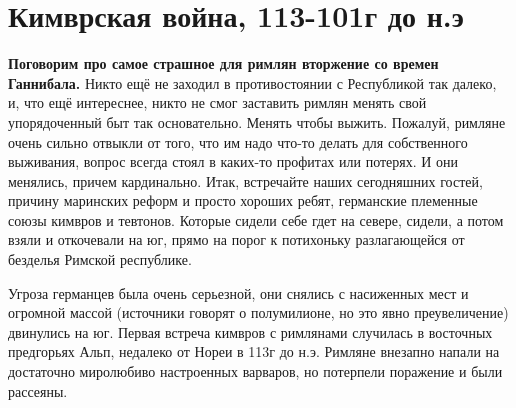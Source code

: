 \chapter{Кимврская война, 113-101г до н.э}



\textbf{Поговорим про самое страшное для римлян вторжение со времен Ганнибала.} Никто ещё не заходил в противостоянии с Республикой так далеко, и, что ещё интереснее, никто не смог заставить римлян менять свой упорядоченный быт так основательно. Менять чтобы выжить. Пожалуй, римляне очень сильно отвыкли от того, что им надо что-то делать для собственного выживания, вопрос всегда стоял в каких-то профитах или потерях. И они менялись, причем кардинально. Итак, встречайте наших сегодняшних гостей, причину маринских реформ и просто хороших ребят, германские племенные союзы кимвров и тевтонов. Которые сидели себе гдет на севере, сидели, а потом взяли и откочевали на юг, прямо на порог к потихоньку разлагающейся от безделья Римской республике.


Угроза германцев была очень серьезной, они снялись с насиженных мест и огромной массой (источники говорят о полумилионе, но это явно преувеличение) двинулись на юг. Первая встреча кимвров с римлянами случилась в восточных предгорьях Альп, недалеко от Нореи в 113г до н.э. Римляне внезапно напали на достаточно миролюбиво настроенных варваров, но потерпели поражение и были рассеяны.

